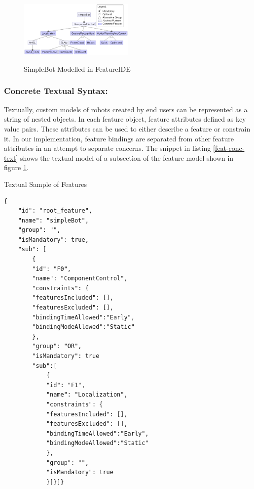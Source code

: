 \begin{figure}[H]
\caption{SimpleBot Modelled in FeatureIDE}
\centering
\includegraphics[width=0.5\textwidth]{diagrams/simpleBot.png}
\label{simplebot}
\end{figure}
\subsubsection{Concrete Textual Syntax: }
Textually, custom models of robots created by end users can be represented as a string of nested objects. In each feature object, feature attributes defined as key value pairs. These attributes can be used to either describe a feature or constrain it. In our implementation, feature bindings are separated from other feature attributes in an attempt to separate concerns. The snippet in listing \ref{feat-conc-text} shows the textual model of a subsection of the feature model shown in figure \ref{simplebot}.


\begin{listing}
\caption{Textual Sample of Features}
\begin{verbatim}
{
    "id": "root_feature",
    "name": "simpleBot",
    "group": "",
    "isMandatory": true,
    "sub": [
        {
        "id": "F0",
        "name": "ComponentControl",
        "constraints": {
        "featuresIncluded": [],
        "featuresExcluded": [],
        "bindingTimeAllowed":"Early",
        "bindingModeAllowed":"Static"
        },
        "group": "OR",
        "isMandatory": true
        "sub":[
            {
            "id": "F1",
            "name": "Localization",
            "constraints": {
            "featuresIncluded": [],
            "featuresExcluded": [],
            "bindingTimeAllowed":"Early",
            "bindingModeAllowed":"Static"
            },
            "group": "",
            "isMandatory": true
            }]}]}
\end{verbatim}
\label{feat-conc-text}
\end{listing}

